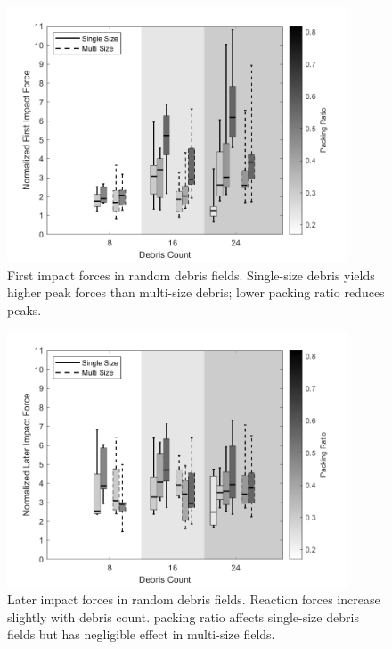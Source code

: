 \documentclass{article}
\begin{document}
{\begin{figure}[htbp]
    \centering
    \includegraphics[width=0.9\textwidth]{First_Peak_Random_Single_vs_Multi_ByDensityGradient.png}
    \caption{First impact forces in random debris fields. Single-size debris yields higher peak forces than multi-size debris; lower packing ratio reduces peaks.}
    \label{fig:random_peaks_first}
\end{figure}

\begin{figure}[htbp]
    \centering
    \includegraphics[width=0.9\textwidth]{Later_Peak_Random_Single_vs_Multi_ByDensityGradient.png}
    \caption{Later impact forces in random debris fields. Reaction forces increase slightly with debris count. packing ratio affects single-size debris fields but has negligible effect in multi-size fields.}
    \label{fig:random_peaks_later}
\end{figure}

}
\end{document}
